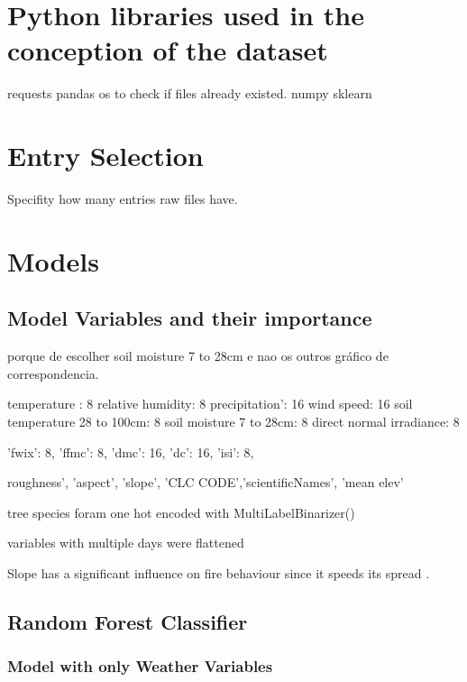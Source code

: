 \section{Python libraries used in the conception of the dataset}
requests
pandas
os to check if files already existed.
numpy
sklearn



\section{Entry Selection}
Specifity how many entries raw files have.







\section{Models}


\subsection{Model Variables and their importance}

porque de escolher soil moisture 7 to 28cm e nao os outros gráfico de correspondencia.

temperature : 8
relative humidity: 8
precipitation': 16
wind speed: 16
soil temperature 28 to 100cm: 8
soil moisture 7 to 28cm: 8
direct normal irradiance: 8

'fwix': 8,
'ffmc': 8,
'dmc': 16,
'dc': 16,
'isi': 8,

roughness', 'aspect', 'slope', 'CLC CODE','scientificNames', 'mean elev'

tree species foram one hot encoded with MultiLabelBinarizer()

variables with multiple days were flattened

Slope has a significant influence on fire behaviour since it speeds its spread \cite{Marques2011}.


\subsection{Random Forest Classifier}



\subsubsection{Model with only Weather Variables}

